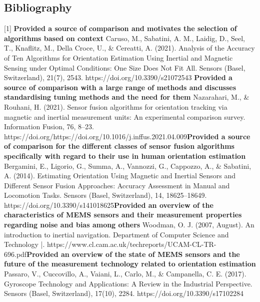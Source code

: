 \documentclass[10pt]{report}
\begin{document}
\subsection*{Bibliography}
[1] \textbf{Provided a source of comparison and motivates the selection of algorithms based on context}\newline
Caruso, M., Sabatini, A. M., Laidig, D., Seel, T., Knaflitz, M., Della Croce, U., \& Cereatti, A. (2021). Analysis of the Accuracy of Ten Algorithms for Orientation Estimation Using Inertial and Magnetic Sensing under Optimal Conditions: One Size Does Not Fit All. Sensors (Basel, Switzerland), 21(7), 2543. https://doi.org/10.3390/s21072543 \newline
[2] \textbf{Provided a source of comparison with a large range of methods and discusses standardising tuning methods and the need for them} \newline
Nazarahari, M., \& Rouhani, H. (2021). Sensor fusion algorithms for orientation tracking via magnetic and inertial measurement units: An experimental comparison survey. Information Fusion, 76, 8–23. https://doi.org/https://doi.org/10.1016/j.inffus.2021.04.009\newline
[3] \textbf{Provided a source of comparison for the different classes of sensor fusion algorithms specifically with regard to their use in human orientation estimation} \newline
Bergamini, E., Ligorio, G., Summa, A., Vannozzi, G., Cappozzo, A., \& Sabatini, A. (2014). Estimating Orientation Using Magnetic and Inertial Sensors and Different Sensor Fusion Approaches: Accuracy Assessment in Manual and Locomotion Tasks. Sensors (Basel, Switzerland), 14, 18625–18649. https://doi.org/10.3390/s141018625\newline
[4] \textbf{Provided an overview of the characteristics of MEMS sensors and their measurement properties regarding noise and bias among others} \newline
Woodman, O. J. (2007, August). An introduction to inertial navigation. Department of Computer Science and Technology |. 
https://www.cl.cam.ac.uk/techreports/UCAM-CL-TR-696.pdf\newline
[5] \textbf{Provided an overview of the state of MEMS sensors and the future of the measurement technology related to orientation estimation} \newline
Passaro, V., Cuccovillo, A., Vaiani, L., Carlo, M., \& Campanella, C. E. (2017). Gyroscope Technology and Applications: A Review in the Industrial Perspective. Sensors (Basel, Switzerland), 17(10), 2284. https://doi.org/10.3390/s17102284\newline
\end{document}
